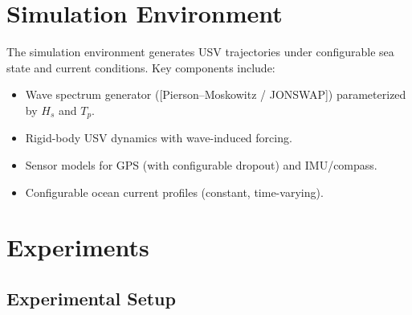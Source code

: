 \documentclass[conference]{IEEEtran}
\begin{document}
\section{Simulation Environment}
\label{sec:simulation}


The simulation environment generates USV trajectories under configurable sea state and current conditions. Key components include:
\begin{itemize}
  \item Wave spectrum generator ([Pierson--Moskowitz / JONSWAP]) parameterized by $H_s$ and $T_p$.
  \item Rigid-body USV dynamics with wave-induced forcing.
  \item Sensor models for GPS (with configurable dropout) and IMU/compass.
  \item Configurable ocean current profiles (constant, time-varying).
\end{itemize}


\section{Experiments}
\label{sec:experiments}

\subsection{Experimental Setup}
\end{document}
